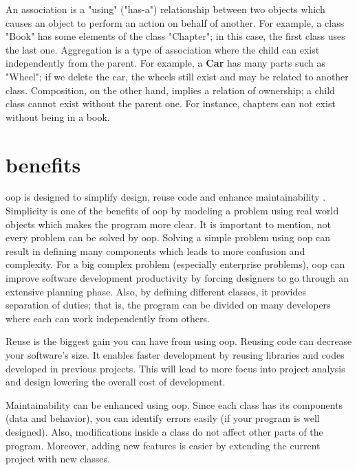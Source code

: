 \documentclass[12pt]{book}
\begin{document}
An association is a "using" ("has-a") relationship between two objects which causes an object to perform an action on behalf of another. 
For example, a class "Book" has some elements of the class "Chapter"; in this case, the first class uses the last one.
Aggregation is a type of association where the child can exist independently from the parent.
For example, a \textbf{Car} has many parts such as "Wheel"; if we delete the car, the wheels still exist and may be related to another class. 
Composition, on the other hand, implies a relation of ownership; a child class cannot exist without the parent one.
For instance, chapters can not exist without being in a book.

\section{benefits}


\ac{oop} is designed to simplify design, reuse code and enhance maintainability \citep{2017-half,2015-popyack-boady}.
Simplicity is one of the benefits of \ac{oop} by modeling a problem using real world objects which makes the program more clear.
It is important to mention, not every problem can be solved by \ac{oop}. 
Solving a simple problem using \ac{oop} can result in defining many components which leads to more confusion and complexity. 
For a big complex problem (especially enterprise problems), \ac{oop} can improve software development productivity by forcing designers to go through an extensive planning phase. 
Also, by defining different classes, it provides separation of duties; that is, the program can be divided on many developers where each can work independently from others.


Reuse is the biggest gain you can have from using \ac{oop}. 
Reusing code can decrease your software's size. 
It enables faster development by reusing libraries and codes developed in previous projects. 
This will lead to more focus into project analysis and design lowering the overall cost of development. 

Maintainability can be enhanced using \ac{oop}. 
Since each class has its components (data and behavior), you can identify errors easily (if your program is well designed).
Also, modifications inside a class do not affect other parts of the program. 
Moreover, adding new features is easier by extending the current project with new classes.
\end{document}
